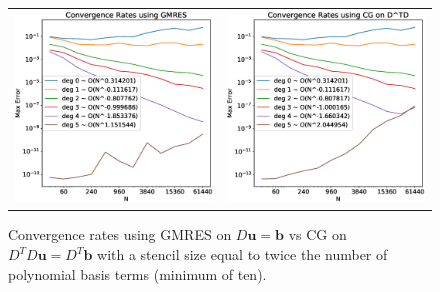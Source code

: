 \documentclass[12pt]{article}
\let\vec\mathbf
\begin{document}
	\begin{figure}[ht]
		\centering
		\begin{tabular}{cc}
			\includegraphics[width=.5\textwidth]{Convergence_GMRES.eps} & \includegraphics[width=.5\textwidth]{Convergence_Transpose.eps}
		\end{tabular}
		\caption{Convergence rates using GMRES on $D\vec{u}=\vec{b}$ vs CG on $D^TD\vec{u}=D^T\vec{b}$ with a stencil size equal to twice the number of polynomial basis terms (minimum of ten).}
		\label{convergence_cg}
	\end{figure}
	
\end{document}
